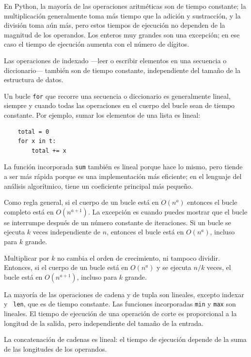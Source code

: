 \documentclass[10pt]{book}
\begin{document}
En Python, la mayoría de las operaciones aritméticas son de tiempo constante;
la multiplicación generalmente toma más tiempo que la adición y sustracción, y
la división toma aún más, pero estos tiempos de ejecución no dependen de la
magnitud de los operandos.  Los enteros muy grandes son una excepción; en
ese caso el tiempo de ejecución aumenta con el número de dígitos.

Las operaciones de indexado ---leer o escribir elementos en una secuencia
o diccionario--- también son de tiempo constante, independiente del tamaño
de la estructura de datos.

Un bucle {\tt for} que recorre una secuencia o diccionario es
generalmente lineal, siempre y cuando todas las operaciones en el cuerpo
del bucle sean de tiempo constante.  Por ejemplo, sumar los
elementos de una lista es lineal:

\begin{verbatim}
    total = 0
    for x in t:
        total += x
\end{verbatim}

La función incorporada {\tt sum} también es lineal porque hace
lo mismo, pero tiende a ser más rápida porque es una implementación
más eficiente; en el lenguaje del análisis algorítmico,
tiene un coeficiente principal más pequeño.

Como regla general, si el cuerpo de un bucle está en $O(n^a)$ entonces
el bucle completo está en $O(n^{a+1})$.  La excepción es cuando puedes
mostrar que el bucle se interrumpe después de un número constante de iteraciones.
Si un bucle se ejecuta $k$ veces independiente de $n$, entonces
el bucle está en $O(n^a)$, incluso para $k$ grande.

Multiplicar por $k$ no cambia el orden de crecimiento, ni tampoco
dividir.  Entonces, si el cuerpo de un bucle está en $O(n^a)$ y se ejecuta
$n/k$ veces, el bucle está en $O(n^{a+1})$, incluso para $k$ grande.

La mayoría de las operaciones de cadena y de tupla son lineales, excepto indexar y {\tt
  len}, que es de tiempo constante.  Las funciones incorporadas {\tt min} y
{\tt max} son lineales.  El tiempo de ejecución de una operación de corte es
proporcional a la longitud de la salida, pero independiente del tamaño
de la entrada.

La concatenación de cadenas es lineal: el tiempo de ejecución depende de la suma
de las longitudes de los operandos.
\end{document}
